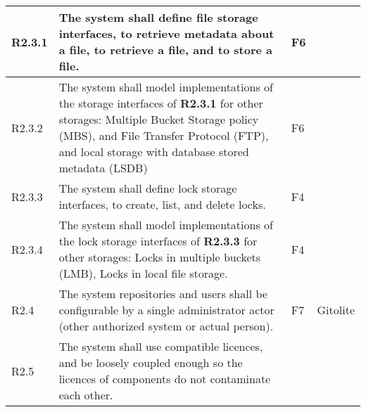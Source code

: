 \documentclass[a4paper,11pt]{article}
\begin{document}
\begin{landscape}
\begin{longtable}{|p{1cm}|p{19cm}|p{2cm}|p{3cm}|}
        \rowcolor[HTML]{EEFFEE}        R2.3.1     & The system shall define file storage interfaces, to retrieve metadata about a file, to retrieve a file, and to store a file.                                                                                                                                                          & F6                    &                                          \\\hline
        \rowcolor[HTML]{FFEEEE}        R2.3.2     & The system shall model implementations of the storage interfaces of \textbf{R2.3.1} for other storages: Multiple Bucket Storage policy (MBS), and File Transfer Protocol (FTP), and local storage with database stored metadata (LSDB)                                                & F6                    &                                          \\\hline
        \rowcolor[HTML]{FFEEEE}        R2.3.3     & The system shall define lock storage interfaces, to create, list, and delete locks.                                                                                                                                                                                                   & F4                    &                                          \\\hline
        \rowcolor[HTML]{FFEEEE}        R2.3.4     & The system shall model implementations of the lock storage interfaces of \textbf{R2.3.3} for other storages: Locks in multiple buckets (LMB), Locks in local file storage.                                                                                                            & F4                    &                                          \\\hline
        \rowcolor[HTML]{DDFFDD}        R2.4       & The system repositories and users shall be configurable by a single administrator actor (other authorized system or actual person).                                                                                                                                                   & F7                    & Gitolite                                 \\ \hline
        \rowcolor[HTML]{DDFFDD}        R2.5       & The system shall use compatible licences, and be loosely coupled enough so the licences of components do not contaminate each other.                                                                                                                                                  &                       &                                          \\ \hline

\end{longtable}
\end{landscape}
\end{document}
